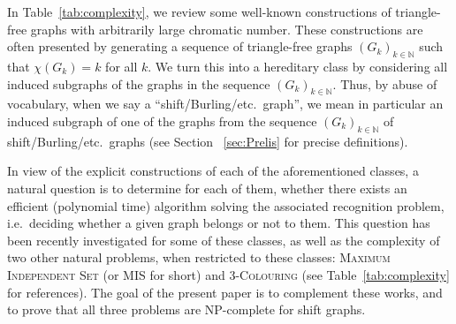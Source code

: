 \documentclass[11pt,a4aper]{article}
\newcommand*{\MIS}
{\textsc{MIS} }
\newcommand{\nicolas}[1]{{\color{purple} NT: #1}}
\newcommand{\ugo}[1]{{\color{red} UG: #1}}
\begin{document}



In Table~\ref{tab:complexity}, we review some well-known
constructions of triangle-free graphs with arbitrarily large chromatic number.
These constructions are often presented by generating a sequence of triangle-free graphs
$(G_k)_{k\in \mathbb{N}}$ such that $\chi(G_k) = k$ for all $k$. We turn this
into a hereditary class by considering all induced subgraphs of the graphs in
the sequence $(G_k)_{k\in \mathbb N}$. Thus, by abuse of vocabulary, when we say a ``shift/Burling/etc.\ graph'', we mean in particular an induced subgraph of one of the graphs from the sequence $(G_k)_{k\in \mathbb N}$ of shift/Burling/etc.\ graphs (see Section~ \ref{sec:Prelis} for precise definitions).   


In view of the explicit constructions of each of the aforementioned classes, a natural question is to determine for each of them, whether there exists an efficient (polynomial time) algorithm solving the associated recognition problem, i.e.\ deciding whether a given graph belongs or not to them. This question has been recently investigated for some of these classes, as well as the complexity of two other natural problems, when restricted to these classes: \textsc{Maximum Independent
Set} (or \MIS for short) and \textsc{3-Colouring} (see Table~\ref{tab:complexity} for references). The goal of the present paper is to complement these works, and to prove that all three
problems are NP-complete for shift graphs.
\end{document}
